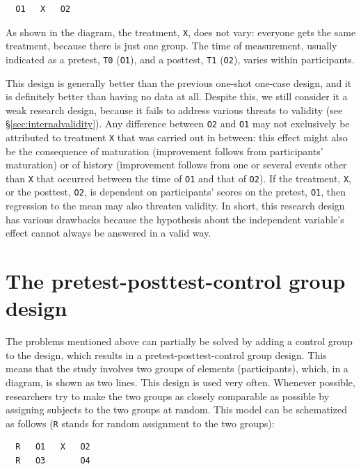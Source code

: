 \documentclass[
]{book}
\begin{document}
\begin{verbatim}
  O1   X   O2
\end{verbatim}

As shown in the diagram, the treatment, \texttt{X}, does not vary: everyone gets the same treatment, because there is just one group. The time of measurement, usually indicated as a pretest, \texttt{T0} (\texttt{O1}), and a posttest, \texttt{T1} (\texttt{O2}), varies within participants.

This design is generally better than the previous one-shot one-case design, and it is definitely better than having no data at all. Despite this, we still consider it a weak research design, because it fails to address various threats to validity (see §\ref{sec:internalvalidity}). Any difference between \texttt{O2} and \texttt{O1} may not exclusively be attributed to treatment \texttt{X} that was carried out in between: this effect might also be the consequence of maturation (improvement follows from participants' maturation) or of history (improvement follows from one or several events other than \texttt{X} that occurred between the time of \texttt{O1} and that of \texttt{O2}). If the treatment, \texttt{X}, or the posttest, \texttt{O2}, is dependent on participants' scores on the pretest, \texttt{O1}, then regression to the mean may also threaten validity. In short, this research design has various drawbacks because the hypothesis about the independent variable's effect cannot always be answered in a valid way.

\hypertarget{sec:pretest-posttest-control-group-design}{%
\section{The pretest-posttest-control group design}\label{sec:pretest-posttest-control-group-design}}

The problems mentioned above can partially be solved by adding a control group to the design, which results in a pretest-posttest-control group design. This means that the study involves two groups of elements (participants), which, in a diagram, is shown as two lines. This design is used very often. Whenever possible, researchers try to make the two groups as closely comparable as possible by assigning subjects to the two groups at random. This model can be schematized as follows (\texttt{R} stands for random assignment to the two groups):

\begin{verbatim}
  R   O1   X   O2
  R   O3       O4
\end{verbatim}
\end{document}
